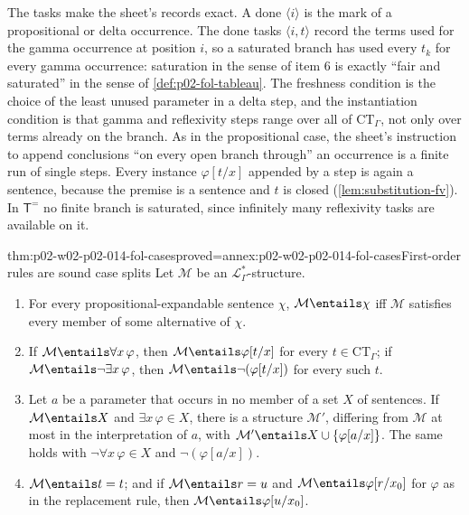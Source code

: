 The tasks make the sheet's records exact.  A done \(\langle i\rangle\) is the
mark of a propositional or delta occurrence.  The done tasks
\(\langle i,t\rangle\) record the terms used for the gamma occurrence at
position \(i\), so a saturated branch has used every \(t_k\) for every gamma
occurrence: saturation in the sense of item 6 is exactly ``fair and
saturated'' in the sense of \cref{def:p02-fol-tableau}.  The freshness
condition is the choice of the least unused parameter in a delta step, and
the instantiation condition is that gamma and reflexivity steps range over
all of \(\mathrm{CT}_{\Gamma}\), not only over terms already on the branch.
As in the propositional case, the sheet's instruction to append conclusions
``on every open branch through'' an occurrence is a finite run of single
steps.  Every instance \(\varphi[t/x]\) appended by a step is again a
sentence, because the premise is a sentence and \(t\) is closed
(\cref{lem:substitution-fv}).  In \(\mathsf T^{=}\) no finite branch is
saturated, since infinitely many reflexivity tasks are available on it.

\begin{hblemma}{thm:p02-w02-p02-014-fol-cases}{proved=annex:p02-w02-p02-014-fol-cases}{First-order rules are sound case splits}
Let \(\mathcal M\) be an \(\mathcal L_{\Gamma}^{*}\)-structure.
\begin{enumerate}
  \item For every propositional-expandable sentence \(\chi\),
        \(\mathcal M\entails\chi\) iff \(\mathcal M\) satisfies every member
        of some alternative of \(\chi\).
  \item If \(\mathcal M\entails\forall x\,\varphi\), then
        \(\mathcal M\entails\varphi[t/x]\) for every
        \(t\in\mathrm{CT}_{\Gamma}\); if
        \(\mathcal M\entails\neg\exists x\,\varphi\), then
        \(\mathcal M\entails\neg(\varphi[t/x])\) for every such \(t\).
  \item Let \(a\) be a parameter that occurs in no member of a set \(X\) of
        sentences.  If \(\mathcal M\entails X\) and
        \(\exists x\,\varphi\in X\), there is a structure \(\mathcal M'\),
        differing from \(\mathcal M\) at most in the interpretation of
        \(a\), with \(\mathcal M'\entails X\cup\{\varphi[a/x]\}\).  The same
        holds with \(\neg\forall x\,\varphi\in X\) and
        \(\neg(\varphi[a/x])\).
  \item \(\mathcal M\entails t=t\); and if \(\mathcal M\entails r=u\) and
        \(\mathcal M\entails\varphi[r/x_0]\) for \(\varphi\) as in the
        replacement rule, then \(\mathcal M\entails\varphi[u/x_0]\).
\end{enumerate}
\end{hblemma}

